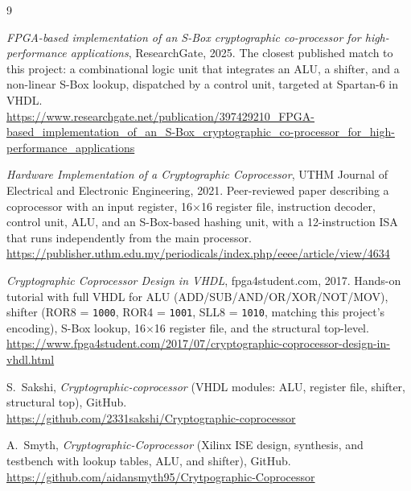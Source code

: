 \documentclass[11pt,a4paper]{article}
\begin{document}
\newpage
\begin{thebibliography}{9}

\emph{FPGA-based implementation of an S-Box cryptographic
co-processor for high-performance applications}, ResearchGate, 2025.
The closest published match to this project: a combinational
logic unit that integrates an ALU, a shifter, and a non-linear
S-Box lookup, dispatched by a control unit, targeted at Spartan-6
in VHDL.\\
\url{https://www.researchgate.net/publication/397429210_FPGA-based_implementation_of_an_S-Box_cryptographic_co-processor_for_high-performance_applications}

\emph{Hardware Implementation of a Cryptographic Coprocessor},
UTHM Journal of Electrical and Electronic Engineering, 2021.
Peer-reviewed paper describing a coprocessor with an input
register, 16$\times$16 register file, instruction decoder,
control unit, ALU, and an S-Box-based hashing unit, with a
12-instruction ISA that runs independently from the main
processor.\\
\url{https://publisher.uthm.edu.my/periodicals/index.php/eeee/article/view/4634}

\emph{Cryptographic Coprocessor Design in VHDL}, fpga4student.com,
2017. Hands-on tutorial with full VHDL for ALU
(ADD/SUB/AND/OR/XOR/NOT/MOV), shifter
(ROR8 = \texttt{1000}, ROR4 = \texttt{1001}, SLL8 = \texttt{1010},
matching this project's encoding), S-Box lookup,
16$\times$16 register file, and the structural top-level.\\
\url{https://www.fpga4student.com/2017/07/cryptographic-coprocessor-design-in-vhdl.html}

S.~Sakshi,
\emph{Cryptographic-coprocessor} (VHDL modules: ALU, register file,
shifter, structural top), GitHub.\\
\url{https://github.com/2331sakshi/Cryptographic-coprocessor}

A.~Smyth,
\emph{Cryptographic-Coprocessor} (Xilinx ISE design, synthesis, and
testbench with lookup tables, ALU, and shifter), GitHub.\\
\url{https://github.com/aidansmyth95/Crytpographic-Coprocessor}

\end{thebibliography}
\end{document}
